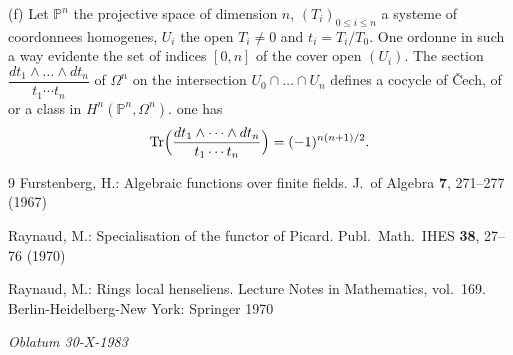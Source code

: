 \documentclass[12pt,a4paper]{article}
\theoremstyle{plain}
\theoremstyle{definition}
\theoremstyle{remark}
\DeclareMathOperator{\Tr}{Tr}
\newcommand{\PP}{\mathbb{P}}
\providecommand{\PP}{\mathbb{P}}
\providecommand{\Tr}{\operatorname{Tr}}
\begin{document}
(f) Let $\PP^n$ the projective space of dimension $n$, $(T_i)_{0\le i\le n}$ a systeme of
coordonnees homogenes, $U_i$ the open $T_i\neq 0$ and $t_i=T_i/T_0$. One ordonne in such a way
evidente the set of indices $[0,n]$ of the cover open $(U_i)$. The section
$\dfrac{dt_1\wedge\dots\wedge dt_n}{t_1\dotsm t_n}$ of $\Omega^n$ on the intersection $U_0\cap\dots\cap U_n$ defines a cocycle of
\v{C}ech, of or a class in $H^n(\PP^n,\Omega^n)$. one has
\[
\Tr\Bigl(\frac{dt_1\wedge\dots\wedge dt_n}{t_1\dotsm t_n}\Bigr)=(-1)^{n(n+1)/2}.
\]

\begin{thebibliography}{9}
Furstenberg, H.: Algebraic functions over finite fields. J.\ of Algebra
\textbf{7}, 271--277 (1967)

Raynaud, M.: Specialisation of the functor of Picard. Publ.\ Math.\ IHES
\textbf{38}, 27--76 (1970)

Raynaud, M.: Rings local henseliens. Lecture Notes in Mathematics,
vol.~169. Berlin-Heidelberg-New York: Springer 1970
\end{thebibliography}

\vspace{1cm}
\noindent\textit{Oblatum 30-X-1983}
\end{document}
